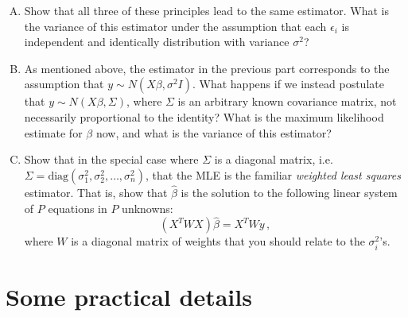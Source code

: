 \documentclass{mynotes}
\begin{document}
\begin{enumerate}[(A)]

\item Show that all three of these principles lead to the same estimator.  What is the variance of this estimator under the assumption that each $\epsilon_i$ is independent and identically distribution with variance $\sigma^2$?  

\item As mentioned above, the estimator in the previous part corresponds to the assumption that $y \sim N(X \beta, \sigma^2 I)$.  What happens if we instead postulate that $y \sim N(X \beta, \Sigma)$, where $\Sigma$ is an arbitrary known covariance matrix, not necessarily proportional to the identity?  What is the maximum likelihood estimate for $\beta$ now, and what is the variance of this estimator?   

\item Show that in the special case where $\Sigma$ is a diagonal matrix, i.e. $\Sigma = \mbox{diag}(\sigma_1^2, \sigma_2^2, \ldots, \sigma_n^2)$, that the MLE is the familiar \emph{weighted least squares} estimator.  That is, show that $\hat \beta$ is the solution to the following linear system of $P$ equations in $P$ unknowns:
$$
(X^T W X) \hat \beta = X^T W y \, ,
$$
where $W$ is a diagonal matrix of weights that you should relate to the $\sigma_i^2$'s.  

\end{enumerate}

\section{Some practical details}
\end{document}

